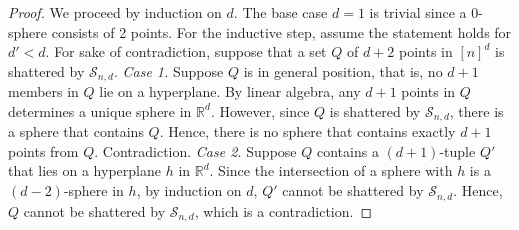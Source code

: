 \documentclass[11pt]{article}
\theoremstyle{plain}
\theoremstyle{definition}
\theoremstyle{remark}
\begin{document}
%
\begin{proof}
We proceed by induction on $d$.  The base case $d = 1$ is trivial since a 0-sphere consists of 2 points.  For the inductive step, assume the statement holds for $d' < d$.  For sake of contradiction, suppose that a set $Q$ of $d+2$ points in $[n]^d$ is shattered by $\mathcal{S}_{n,d}$. 
%
\medskip
%
%
\noindent \emph{Case 1.}  Suppose $Q$ is in general position, that is, no $d+1$ members in $Q$ lie on a hyperplane.  By linear algebra, any $d+1$ points in $Q$ determines a unique sphere in $\mathbb{R}^d$. 
 However, since $Q$ is shattered by $\mathcal{S}_{n,d}$, there is a sphere that contains $Q$.  Hence, there is no sphere that contains exactly $d + 1$ points from $Q$.  Contradiction.
%
 \medskip
\noindent \emph{Case 2.}  Suppose $Q$ contains a $(d+1)$-tuple $Q'$ that lies on a hyperplane $h$ in $\mathbb{R}^d$.  Since the intersection of a sphere with $h$ is a $(d-2)$-sphere in $h$, by induction on $d$, $Q'$ cannot be shattered by $\mathcal{S}_{n,d}$.  Hence, $Q$ cannot be shattered by  $\mathcal{S}_{n,d}$, which is a contradiction. \end{proof}
%
%
%
%
%
%
%
\end{document}
